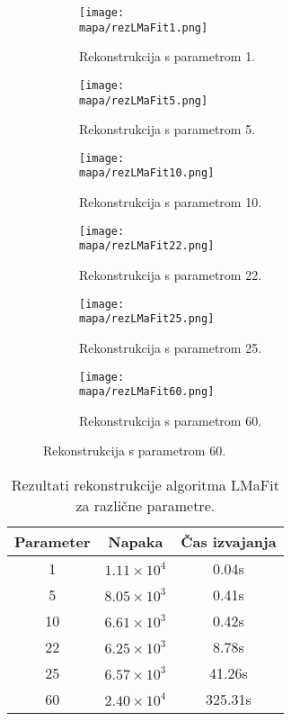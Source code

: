 \renewcommand{\mapa}{Poglavja/Slike/informacija ranga}

\begin{figure}[!ht]
    \begin{subfigure}{0.325\linewidth}
        \texttt{[image: \\mapa/rezLMaFit1.png]}
        \caption{Rekonstrukcija s parametrom 1.}
    \end{subfigure}
    \hfill
    \begin{subfigure}{0.325\linewidth}
        \texttt{[image: \\mapa/rezLMaFit5.png]}
        \caption{Rekonstrukcija s parametrom 5.}
    \end{subfigure}
    \hfill
    \begin{subfigure}{0.325\linewidth}
        \texttt{[image: \\mapa/rezLMaFit10.png]}
        \caption{Rekonstrukcija s parametrom 10.}
    \end{subfigure}

    \begin{subfigure}{0.325\linewidth}
        \texttt{[image: \\mapa/rezLMaFit22.png]}
        \caption{Rekonstrukcija s parametrom 22.}
    \end{subfigure}
    \hfill
    \begin{subfigure}{0.325\linewidth}
        \texttt{[image: \\mapa/rezLMaFit25.png]}
        \caption{Rekonstrukcija s parametrom 25.}
    \end{subfigure}
    \hfill
    \begin{subfigure}{0.325\linewidth}
        \texttt{[image: \\mapa/rezLMaFit60.png]}
        \caption{Rekonstrukcija s parametrom 60.}
    \end{subfigure}
\end{figure}

\begin{table}[h]
    \centering
    \begin{tabular}{|c|c|c|}
        \hline
        Parameter & Napaka & Čas izvajanja \\
        \hline
        1         & $1.11 \times 10^4$ & 0.04s        \\
        5         & $8.05 \times 10^3$ & 0.41s         \\
        10        & $6.61 \times 10^3$ & 0.42s        \\
        22        & $6.25 \times 10^3$ & 8.78s       \\
        25        & $6.57 \times 10^3$ & 41.26s        \\
        60        & $2.40 \times 10^4$ & 325.31s        \\
        \hline
    \end{tabular}
    \caption{Rezultati rekonstrukcije algoritma LMaFit za različne parametre.}
\end{table}
